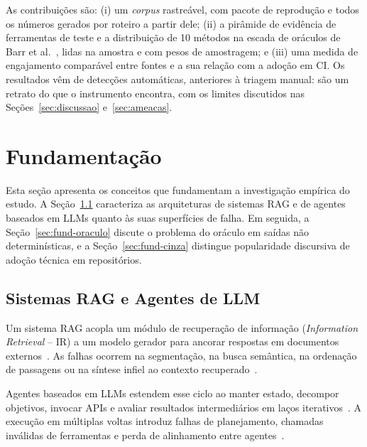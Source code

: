\documentclass[sigconf]{acmart}
\begin{document}
As contribuições são: (i) um \textit{corpus} rastreável, com pacote de reprodução e todos os números gerados por roteiro a partir dele; (ii) a pirâmide de evidência de \ResFerramentasTeste{} ferramentas de teste e a distribuição de 10 métodos na escada de oráculos de Barr et al.~\cite{barr2015oracle}, lidas na amostra e com pesos de amostragem; e (iii) uma medida de engajamento comparável entre fontes e a sua relação com a adoção em CI. Os resultados vêm de detecções automáticas, anteriores à triagem manual: são um retrato do que o instrumento encontra, com os limites discutidos nas Seções~\ref{sec:discussao} e~\ref{sec:ameacas}.

\section{Fundamentação}
\label{sec:fundamentacao}

Esta seção apresenta os conceitos que fundamentam a investigação empírica do estudo. A Seção~\ref{sec:fund-rag-agentes} caracteriza as arquiteturas de sistemas RAG e de agentes baseados em LLMs quanto às suas superfícies de falha. Em seguida, a Seção~\ref{sec:fund-oraculo} discute o problema do oráculo em saídas não determinísticas, e a Seção~\ref{sec:fund-cinza} distingue popularidade discursiva de adoção técnica em repositórios.

\subsection{Sistemas RAG e Agentes de LLM}
\label{sec:fund-rag-agentes}

Um sistema RAG acopla um módulo de recuperação de informação (\textit{Information Retrieval} -- IR) a um modelo gerador para ancorar respostas em documentos externos~\cite{lewis2020rag,gao2023ragsurvey}. As falhas ocorrem na segmentação, na busca semântica, na ordenação de passagens ou na síntese infiel ao contexto recuperado~\cite{barnett2024seven,yu2024ragsurvey}.

Agentes baseados em LLMs estendem esse ciclo ao manter estado, decompor objetivos, invocar APIs e avaliar resultados intermediários em laços iterativos~\cite{yehudai2025agents,liu2024agentbench}. A execução em múltiplas voltas introduz falhas de planejamento, chamadas inválidas de ferramentas e perda de alinhamento entre agentes~\cite{cemri2025multiagent,yao2024taubench}.
\end{document}
